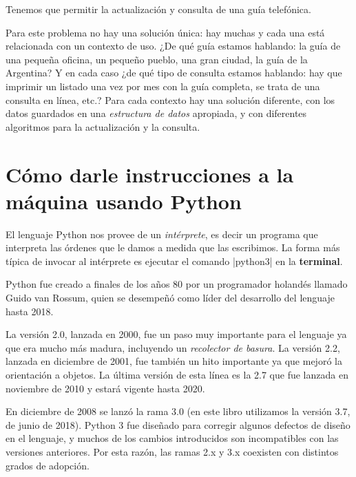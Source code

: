 \begin{problemac}

Tenemos que permitir la actualización y consulta de una guía
telefónica.

\end{problemac}

Para este problema no hay una solución única: hay muchas y cada
una está relacionada con un contexto de uso. ¿De qué guía estamos
hablando: la guía de una pequeña oficina, un pequeño pueblo, una
gran ciudad, la guía de la Argentina? Y en cada caso ¿de qué tipo
de consulta estamos hablando: hay que imprimir un listado una vez
por mes con la guía completa, se trata de una consulta en línea,
etc.? Para cada contexto hay una solución diferente, con los datos
guardados en una \emph{estructura de datos} apropiada, y con
diferentes algoritmos para la actualización y la consulta.

%
%

\section{Cómo darle instrucciones a la máquina usando Python}

El lenguaje Python nos provee de un \emph{intérprete}, es decir un programa que
interpreta las órdenes que le damos a medida que las escribimos. La forma más
típica de invocar al intérprete es ejecutar el comando |python3| en
la {\bf terminal}.

\begin{sabias_que}
Python fue creado a finales de los años 80 por un programador holandés
llamado Guido van Rossum, quien se desempeñó como líder del
desarrollo del lenguaje hasta 2018.

La versión 2.0, lanzada en 2000, fue un paso muy importante para el
lenguaje ya que era mucho más madura, incluyendo un \textit{recolector de
basura}.  La versión 2.2, lanzada en diciembre de 2001, fue también un hito
importante ya que mejoró la orientación a objetos.  La última versión de
esta línea es la 2.7 que fue lanzada en noviembre de 2010 y estará vigente
hasta 2020.

En diciembre de 2008 se lanzó la rama 3.0 (en este libro utilizamos la versión
3.7, de junio de 2018). Python 3 fue diseñado
para corregir algunos defectos de diseño en el lenguaje, y muchos de los
cambios introducidos son incompatibles con las versiones anteriores. Por esta
razón, las ramas 2.x y 3.x coexisten con distintos grados de adopción.
\end{sabias_que}

